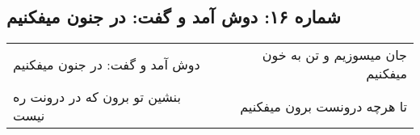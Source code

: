\begin{center}
\section*{شماره ۱۶: دوش آمد و گفت: در جنون میفکنیم}
\label{sec:016}
\begin{longtable}{l p{0.5cm} r}
دوش آمد و گفت: در جنون میفکنیم
&&
جان میسوزیم و تن به خون میفکنیم
\\
بنشین تو برون که در درونت ره نیست
&&
تا هرچه درونست برون میفکنیم
\\
\end{longtable}
\end{center}
